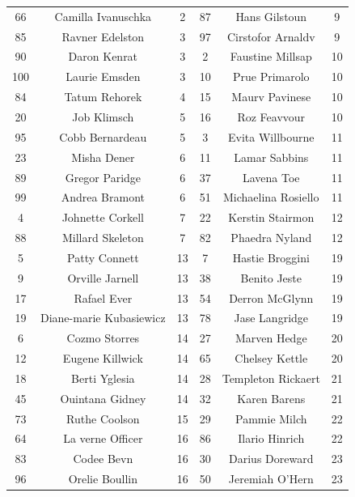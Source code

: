 \documentclass[11pt,letterpaper]{article}
\begin{document}
\begin{enumerate}
\begin{center}
\begin{tabular}{ | c  c  c |  c c c | }
				66 & Camilla Ivanuschka & 2 & 87 & Hans Gilstoun & 9 \\
				85 & Ravner Edelston & 3 & 97 & Cirstofor Arnaldv & 9 \\
				90 & Daron Kenrat & 3 & 2 & Faustine Millsap & 10 \\
				100 & Laurie Emsden & 3 & 10 & Prue Primarolo & 10 \\
				
				84 & Tatum Rehorek & 4 & 15 & Maurv Pavinese & 10 \\
				20 & Job Klimsch & 5 & 16 & Roz Feavvour & 10 \\
				95 & Cobb Bernardeau & 5 & 3 & Evita Willbourne & 11 \\
				23 & Misha Dener & 6 & 11 & Lamar Sabbins & 11 \\
				
				89 & Gregor Paridge & 6 & 37 & Lavena Toe & 11 \\
				99 & Andrea Bramont & 6 & 51 & Michaelina Rosiello & 11 \\
				4 & Johnette Corkell & 7 & 22 & Kerstin Stairmon & 12 \\
				88 & Millard Skeleton & 7 & 82 & Phaedra Nyland & 12 \\
				\hline
				\hline
				5 & Patty Connett & 13 & 7 & Hastie Broggini & 19 \\
				9 & Orville Jarnell & 13 & 38 & Benito Jeste & 19 \\
				17 & Rafael Ever & 13 & 54 & Derron McGlynn & 19 \\
				19 & Diane-marie Kubasiewicz & 13 & 78 & Jase Langridge & 19 \\
				
				6 & Cozmo Storres & 14 & 27 & Marven Hedge & 20 \\
				12 & Eugene Killwick & 14 & 65 & Chelsey Kettle & 20 \\
				18 & Berti Yglesia & 14 & 28 & Templeton Rickaert & 21 \\
				45 & Ouintana Gidney & 14 & 32 & Karen Barens & 21 \\
				
				73 & Ruthe Coolson & 15 & 29 & Pammie Milch & 22 \\
				64 & La verne Officer & 16 & 86 & Ilario Hinrich & 22 \\
				83 & Codee Bevn & 16 & 30 & Darius Doreward & 23 \\
				96 & Orelie Boullin & 16 & 50 & Jeremiah O'Hern & 23 \\
				

\end{tabular}
\end{center}
\end{enumerate}
\end{document}
